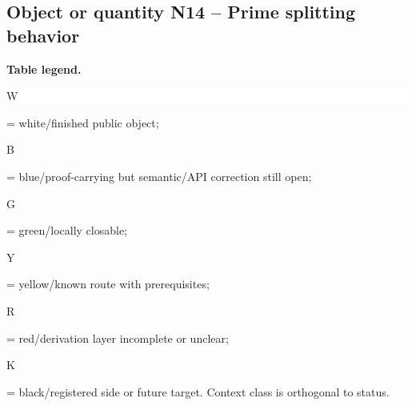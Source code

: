 \subsection*{Object or quantity N14 -- Prime splitting behavior}
\hypertarget{objproof:N14}{}
\par\smallskip\noindent\begin{minipage}{0.99\linewidth}\footnotesize\raggedright\textbf{Table legend.} \colorbox{white}{\strut W} = white/finished public object; \colorbox{cyan!20}{\strut B} = blue/proof-carrying but semantic/API correction still open; \colorbox{green!18}{\strut G} = green/locally closable; \colorbox{yellow!25}{\strut Y} = yellow/known route with prerequisites; \colorbox{red!20}{\strut R} = red/derivation layer incomplete or unclear; \colorbox{black!18}{\strut K} = black/registered side or future target. Context class is orthogonal to status.\end{minipage}\par\vspace{0.25em}
